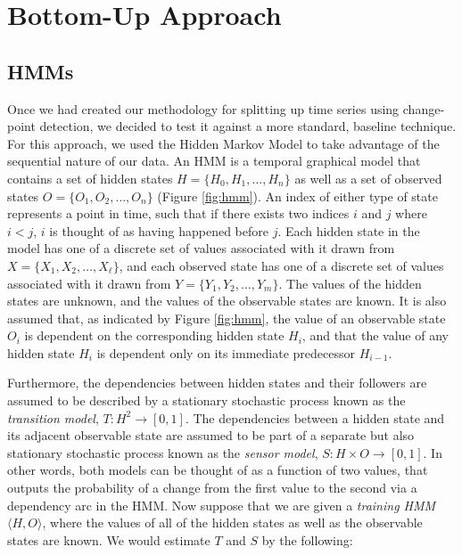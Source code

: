 \section{Bottom-Up Approach}
\label{sec:bottomup}

\subsection{HMMs}

Once we had created our methodology for splitting up time series using change-
point detection, we decided to test it against a more standard,
baseline technique. For this approach, we used the Hidden Markov Model to take
advantage of the sequential nature of our data. An HMM is a temporal graphical model
that contains a set of hidden states $H = \{H_0,H_1, \ldots, H_n\}$ as well as a set of
observed states $O = \{O_1,O_2, \ldots, O_n\}$ (Figure \ref{fig:hmm}). An index
of either type of state represents a point in time, such that if there exists
two indices $i$ and $j$ where $i < j$, $i$ is thought of as having happened
before $j$. Each hidden state in the model has one of a discrete set of values associated
with it drawn from $X=\{X_1,X_2, \ldots, X_{\ell}\}$, and each observed state has one
of a discrete set of values associated with it drawn from $Y=\{Y_1,Y_2, \ldots, Y_m\}$.
The values of the hidden states are unknown, and the values of the observable
states are known.
It is also assumed that, as indicated by Figure \ref{fig:hmm}, the
value of an observable state $O_i$ is dependent on the corresponding
hidden state $H_i$, and that the value of any hidden state $H_i$ is dependent only on
its immediate predecessor $H_{i-1}$.

Furthermore, the dependencies between hidden states and their followers
are assumed to be described by a stationary stochastic process
known as the \emph{transition model}, \mbox{$T: H^2 \rightarrow [0,1]$}.
The dependencies between a hidden state and its adjacent
observable state are assumed to be part of a separate but also
stationary stochastic process known as the \emph{sensor model},
$S: H \times O \rightarrow [0,1]$. In other words, both models can be thought
of as a function of two values, that outputs the probability of a
change from the first value to the second via a dependency arc in the HMM.
Now suppose that we are given a \emph{training HMM} $\langle H,O \rangle$,
where the values of all of the hidden states as well as the
observable states are known. We would estimate $T$ and $S$ by the following:

